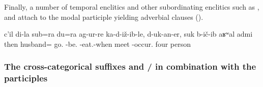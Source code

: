 Finally, a number of temporal enclitics and other subordinating enclitics such as   ,   and   attach to the modal participle yielding adverbial clauses ().


\begin{exe}
	\ex	\label{ex:Then my husband and I were sitting and when we were eating we met four men.}
	\gll	c'il	di-la		sub=ra		du=ra		ag-ur-re			ka-d-iž-ib-le,		d-uk-an-er,	suk	b-ič-ib			aʁʷal	admi\\
		then		husband=		go.	-be.	-eat.-when		meet	-occur.	four	person\\
	\glt	{}
\end{exe}




\subsubsection{The cross-categorical suffixes  and \slash{} in combination with the participles}
\label{sssec:The attributive markers -il and -ce / -te in combination with the participles}

